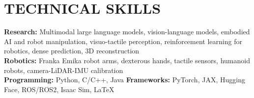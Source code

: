 \documentclass[11pt,a4paper]{article}
\begin{document}
\section{TECHNICAL SKILLS}
\textbf{Research:} Multimodal large language models, vision-language models, embodied AI and robot manipulation, visuo-tactile perception, reinforcement learning for robotics, dense prediction, 3D reconstruction\\
\textbf{Robotics:} Franka Emika robot arms, dexterous hands, tactile sensors, humanoid robots, camera-LiDAR-IMU calibration\\
\textbf{Programming:} Python, C/C++, Java \quad
\textbf{Frameworks:} PyTorch, JAX, Hugging Face, ROS/ROS2, Isaac Sim, \LaTeX
\end{document}
